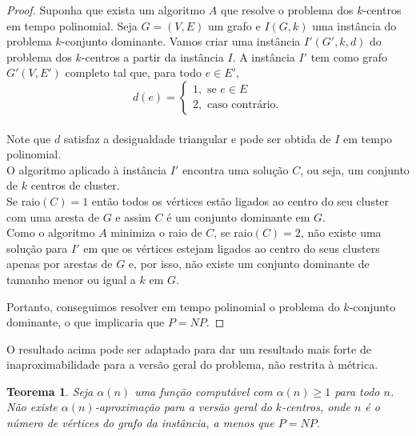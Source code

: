 \documentclass[12pt]{article}
\newtheorem{theorem}{Teorema}[section]
\newcommand{\NP}{\mathit{NP}}
\begin{document}
\begin{proof}
    Suponha que exista um algoritmo $A$ que resolve o problema dos $k$-centros em tempo polinomial. Seja $G = (V,E)$ um grafo e $I(G,k)$ uma instância do problema $k$-conjunto dominante. Vamos criar uma instância $I'(G',k,d)$ do problema dos $k$-centros a partir da instância $I$. A instância $I'$ tem como grafo $G'(V,E')$ completo tal que, para todo $e \in E'$, \\
    \[
    d(e) = \begin{cases}
            1, \text{ se } e \in E \\
            2, \text{ caso contrário.} 
            \end{cases}\]\\
    Note que $d$ satisfaz a desigualdade triangular e pode ser obtida de $I$ em tempo polinomial.\\
    O algoritmo aplicado à instância $I'$ encontra uma solução $C$, ou seja, um conjunto de $k$ centros de cluster. \\Se raio$(C)=1$ então todos os vértices estão ligados ao centro do seu cluster com uma aresta de $G$ e assim $C$ é um conjunto dominante em $G$. \\
    Como o algoritmo $A$ minimiza o raio de $C$, se raio$(C)=2$, não existe uma solução para $I'$ em que os vértices estejam ligados ao centro do seus clusters apenas por arestas de $G$ e, por isso, não existe um conjunto dominante de tamanho menor ou igual a $k$ em $G$.

    Portanto, conseguimos resolver em tempo polinomial o problema do $k$-conjunto dominante, o que implicaria que $P = \NP$.
\end{proof}

O resultado acima pode ser adaptado para dar um resultado mais forte de inaproximabilidade para a versão geral do problema, não restrita à métrica.
\begin{theorem}
    Seja $\alpha(n)$ uma função computável com $\alpha(n)\geq 1$ para todo $n$. Não existe $\alpha(n)$-aproximação para a versão geral do $k$-centros, onde $n$ é o número de vértices do grafo da instância, a menos que $P=\NP$.
\end{theorem}
\end{document}
